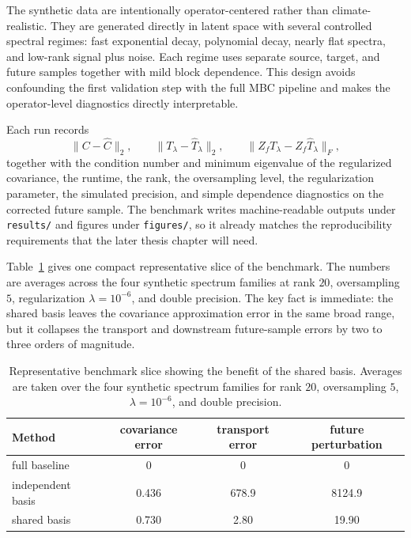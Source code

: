 The synthetic data are intentionally operator-centered rather than climate-realistic. They are generated directly in latent space with several controlled spectral regimes: fast exponential decay, polynomial decay, nearly flat spectra, and low-rank signal plus noise. Each regime uses separate source, target, and future samples together with mild block dependence. This design avoids confounding the first validation step with the full MBC pipeline and makes the operator-level diagnostics directly interpretable.

Each run records
\[
	\|C - \widehat C\|_2,
	\qquad
	\|T_\lambda - \widehat T_\lambda\|_2,
	\qquad
	\|Z_fT_\lambda - Z_f\widehat T_\lambda\|_F,
\]
together with the condition number and minimum eigenvalue of the regularized covariance, the runtime, the rank, the oversampling level, the regularization parameter, the simulated precision, and simple dependence diagnostics on the corrected future sample. The benchmark writes machine-readable outputs under \texttt{results/} and figures under \texttt{figures/}, so it already matches the reproducibility requirements that the later thesis chapter will need.

Table~\ref{tab:joint-basis-summary} gives one compact representative slice of the benchmark. The numbers are averages across the four synthetic spectrum families at rank $20$, oversampling $5$, regularization $\lambda = 10^{-6}$, and double precision. The key fact is immediate: the shared basis leaves the covariance approximation error in the same broad range, but it collapses the transport and downstream future-sample errors by two to three orders of magnitude.

\begin{table}[t]
	\centering
	\caption{Representative benchmark slice showing the benefit of the shared basis. Averages are taken over the four synthetic spectrum families for rank $20$, oversampling $5$, $\lambda = 10^{-6}$, and double precision.}
	\label{tab:joint-basis-summary}
	\begin{tabular}{lccc}
		\toprule
		Method            & covariance error & transport error & future perturbation \\
		\midrule
		full baseline     & 0                & 0               & 0                   \\
		independent basis & 0.436            & 678.9           & 8124.9              \\
		shared basis      & 0.730            & 2.80            & 19.90               \\
		\bottomrule
	\end{tabular}
\end{table}

